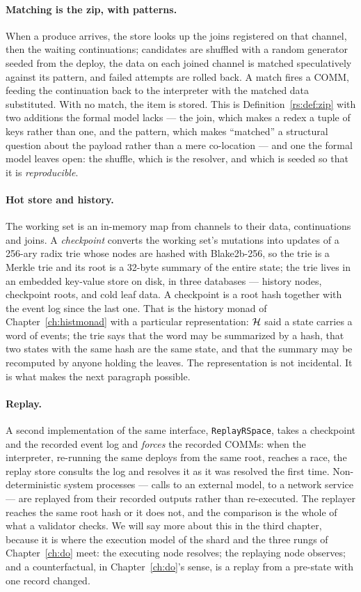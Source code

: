 \paragraph{Matching is the zip, with patterns.} When a produce arrives, the store looks up
the joins registered on that channel, then the waiting continuations; candidates are
shuffled with a random generator seeded from the deploy, the data on each joined channel is
matched speculatively against its pattern, and failed attempts are rolled back. A match
fires a COMM, feeding the continuation back to the interpreter with the matched data
substituted. With no match, the item is stored. This is Definition~\ref{rs:def:zip} with
two additions the formal model lacks --- the join, which makes a redex a tuple of keys
rather than one, and the pattern, which makes ``matched'' a structural question about the
payload rather than a mere co-location --- and one the formal model leaves open: the
shuffle, which is the resolver, and which is seeded so that it is \emph{reproducible}.

\paragraph{Hot store and history.} The working set is an in-memory map from channels to
their data, continuations and joins. A \emph{checkpoint} converts the working set's
mutations into updates of a 256-ary radix trie whose nodes are hashed with Blake2b-256, so
the trie is a Merkle trie and its root is a 32-byte summary of the entire state; the trie
lives in an embedded key-value store on disk, in three databases --- history nodes,
checkpoint roots, and cold leaf data. A checkpoint is a root hash together with the event
log since the last one. That is the history monad of Chapter~\ref{ch:histmonad} with a
particular representation: $\mathcal{H}$ said a state carries a word of events; the trie says
that the word may be summarized by a hash, that two states with the same hash are the same
state, and that the summary may be recomputed by anyone holding the leaves. The
representation is not incidental. It is what makes the next paragraph possible.

\paragraph{Replay.} A second implementation of the same interface, \texttt{ReplayRSpace},
takes a checkpoint and the recorded event log and \emph{forces} the recorded COMMs: when
the interpreter, re-running the same deploys from the same root, reaches a race, the replay
store consults the log and resolves it as it was resolved the first time. Non-deterministic
system processes --- calls to an external model, to a network service --- are replayed from
their recorded outputs rather than re-executed. The replayer reaches the same root hash or
it does not, and the comparison is the whole of what a validator checks. We will say more
about this in the third chapter, because it is where the execution model of the shard and
the three rungs of Chapter~\ref{ch:do} meet: the executing node resolves; the replaying
node observes; and a counterfactual, in Chapter~\ref{ch:do}'s sense, is a replay from a
pre-state with one record changed.

